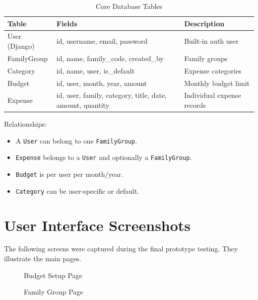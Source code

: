 \documentclass[12pt,a4paper]{article}
\begin{document}
\begin{table}[H]
\centering
\begin{tabular}{|l|l|l|}
\hline
\textbf{Table} & \textbf{Fields} & \textbf{Description} \\ \hline
User (Django) & id, username, email, password & Built-in auth user \\ \hline
FamilyGroup & id, name, family\_code, created\_by & Family groups \\ \hline
Category & id, name, user, is\_default & Expense categories \\ \hline
Budget & id, user, month, year, amount & Monthly budget limit \\ \hline
Expense & id, user, family, category, title, date, amount, quantity & Individual expense records \\ \hline
\end{tabular}
\caption{Core Database Tables}
\end{table}

Relationships:
\begin{itemize}
    \item A \texttt{User} can belong to one \texttt{FamilyGroup}.
    \item \texttt{Expense} belongs to a \texttt{User} and optionally a \texttt{FamilyGroup}.
    \item \texttt{Budget} is per user per month/year.
    \item \texttt{Category} can be user‑specific or default.
\end{itemize}

\section{User Interface Screenshots}
The following screens were captured during the final prototype testing. They illustrate the main pages.

\begin{figure}[H]
\centering
{}
\caption{Budget Setup Page}
\end{figure}

\begin{figure}[H]
\centering
{}
\caption{Family Group Page}
\end{figure}
\end{document}
